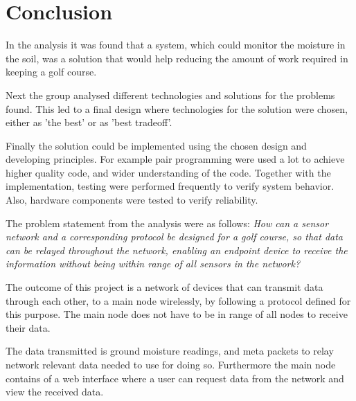 \section{Conclusion}


In the analysis it was found that a system, which could monitor the moisture in the soil, was a solution that would help reducing the amount of work required in keeping a golf course.

Next the group analysed different technologies and solutions for the problems found. This led to a final design where technologies for the solution were chosen, either as 'the best' or as 'best tradeoff'.

Finally the solution could be implemented using the chosen design and developing principles. For example pair programming were used a lot to achieve higher quality code, and wider understanding of the code. Together with the implementation, testing were performed frequently to verify system behavior. Also, hardware components were tested to verify reliability.

The problem statement from the analysis were as follows:
\textit{How can a sensor network and a corresponding protocol be designed for a golf course, so that data can be relayed throughout the network, enabling an endpoint device to receive the information without being within range of all sensors in the network?}

The outcome of this project is a network of devices that can transmit data through each other, to a main node wirelessly, by following a protocol defined for this purpose. The main node does not have to be in range of all nodes to receive their data.

The data transmitted is ground moisture readings, and meta packets to relay network relevant data needed to use for doing so. Furthermore the main node contains of a web interface where a user can request data from the network and view the received data.
